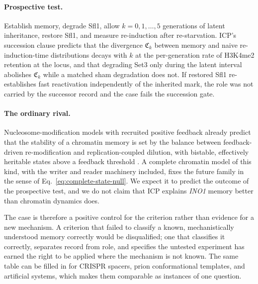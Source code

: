\paragraph{Prospective test.} Establish memory, degrade Sfl1, allow
$k=0,1,\ldots,5$ generations of latent inheritance, restore Sfl1, and measure
re-induction after re-starvation. ICP's succession clause predicts that the
divergence $\mathfrak C_k$ between memory and naive re-induction-time
distributions decays with $k$ at the per-generation rate of H3K4me2 retention at
the locus, and that degrading Set3 only during the latent interval abolishes
$\mathfrak C_k$ while a matched sham degradation does not. If restored Sfl1
re-establishes fast reactivation independently of the inherited mark, the
role was not carried by the successor record and the case fails the
succession gate.

\paragraph{The ordinary rival.} Nucleosome-modification models with recruited
positive feedback already predict that the stability of a chromatin memory is
set by the balance between feedback-driven re-modification and
replication-coupled dilution, with bistable, effectively heritable states above
a feedback threshold \citep{DoddEtAl2007EpigeneticMemory}. A complete chromatin
model of this kind, with the writer and reader machinery included, fixes the
future family in the sense of Eq.~\eqref{eq:complete-state-null}. We expect
it to predict the outcome of the prospective test, and we do not claim that ICP
explains \textit{INO1} memory better than chromatin dynamics does.

The case is therefore a positive control for the criterion rather than
evidence for a new mechanism. A criterion that failed to classify a known,
mechanistically understood memory correctly would be disqualified; one that
classifies it correctly, separates record from role, and specifies the
untested experiment has earned the right to be applied where the mechanism is
not known. The same table can be filled in for CRISPR spacers, prion
conformational templates, and artificial systems, which makes them comparable
as instances of one question.
